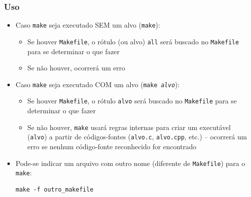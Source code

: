 \documentclass[aspectratio=169]{beamer}
\begin{document}
\begin{frame}[fragile]\frametitle{Uso}
\begin{itemize}
	\item Caso \texttt{make} seja executado SEM um alvo (\texttt{make}):
	\begin{itemize}
		\item Se houver \texttt{Makefile}, o rótulo (ou alvo) \texttt{all} será buscado no \texttt{Makefile} para se determinar o que fazer
		\item Se não houver, ocorrerá um erro
	\end{itemize}
	\item Caso \texttt{make} seja executado COM um alvo (\texttt{make \emph{alvo}}):
	\begin{itemize}
		\item Se houver \texttt{Makefile}, o rótulo \texttt{alvo} será buscado no \texttt{Makefile} para se determinar o que fazer
		\item Se não houver, \texttt{make} usará regras internas para criar um executável (\texttt{alvo}) a partir de códigos-fontes (\texttt{alvo.c}, \texttt{alvo.cpp}, etc.) -- ocorrerá um erro se nenhum código-fonte reconhecido for encontrado
	\end{itemize}
	\item Pode-se indicar um arquivo com outro nome (diferente de \texttt{Makefile}) para o \texttt{make}:
\begin{lstlisting}
make -f outro_makefile
\end{lstlisting}
\end{itemize}
\end{frame}
\end{document}
